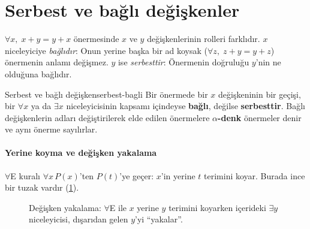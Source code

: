 \section{Serbest ve bağlı değişkenler}\label{sec:serbest-bagli}

$\forall x,\; x + y = y + x$ önermesinde $x$ ve $y$ değişkenlerinin
rolleri farklıdır. $x$ niceleyiciye \emph{bağlıdır}: Onun yerine başka
bir ad koysak ($\forall z,\; z + y = y + z$) önermenin anlamı değişmez.
$y$ ise \emph{serbesttir}: Önermenin doğruluğu $y$'nin ne olduğuna
bağlıdır.

\begin{tanim}{Serbest ve bağlı değişken}{serbest-bagli}
Bir önermede bir $x$ değişkeninin bir geçişi, bir $\forall x$ ya da
$\exists x$ niceleyicisinin kapsamı içindeyse \textbf{bağlı}, değilse
\textbf{serbesttir}. Bağlı değişkenlerin adları değiştirilerek elde
edilen önermelere \textbf{$\alpha$-denk} önermeler denir ve aynı önerme
sayılırlar.
\end{tanim}

\paragraph{Yerine koyma ve değişken yakalama}
$\forall$E kuralı $\forall x\,P(x)$'ten $P(t)$'ye geçer: $x$'in yerine $t$
terimini koyar. Burada ince bir tuzak vardır (\cref{fig:yakalama}).

\begin{figure}[htbp]
\centering
{}
\caption{Değişken yakalama: $\forall$E ile $x$ yerine $y$ terimini koyarken
içerideki $\exists y$ niceleyicisi, dışarıdan gelen $y$'yi ``yakalar''.}
\label{fig:yakalama}
\end{figure}

